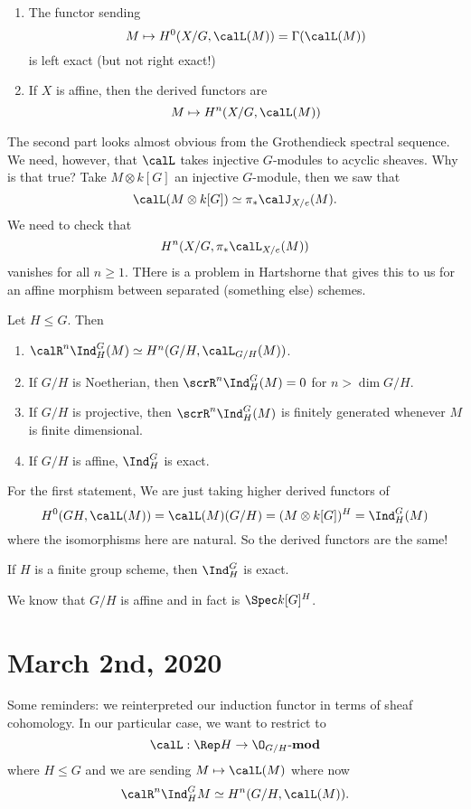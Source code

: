 \documentclass[12pt]{article}
\begin{document}
\begin{prop}
	\begin{enumerate}
		\item The functor sending 
		\[M\mapsto H^0(X/G,\calL(M))=\Gamma(\calL(M))\]
		is left exact (but not right exact!)
		\item If $X$ is affine, then the derived functors are 
		\[M\mapsto H^n(X/G,\calL(M))\]
	\end{enumerate}
\end{prop}
\begin{prf}
	The second part looks almost obvious from the Grothendieck spectral sequence. We need, however, 
	that $\calL$ takes injective $G$-modules to acyclic sheaves. Why is that true? Take $M\otimes k[G]$ an 
	injective $G$-module, then we saw that 
	\[\calL(M\otimes k[G])\simeq \pi_\ast\calJ_{X/e}(M).\]
	We need to check that 
	\[H^n(X/G,\pi_\ast\calL_{X/e}(M))\]
	vanishes for all $n\ge 1$. THere is a problem in Hartshorne that gives this to us for an affine morphism between separated (something else) schemes.
\end{prf}
\begin{prop}
	Let $H\le G$. Then 
	\begin{enumerate}
		\item $\calR^n\Ind_H^G(M)\simeq H^n(G/H,\calL_{G/H}(M))$.
		\item If $G/H$ is Noetherian, then $\scrR^n\Ind_H^G(M)=0$ for $n>\dim G/H$.
		\item If $G/H$ is projective, then $\scrR^n\Ind_H^G(M)$ is finitely generated whenever $M$ is finite dimensional.
		\item If $G/H$ is affine, $\Ind_H^G$ is exact.
	\end{enumerate}
\end{prop}
\begin{prf}
	For the first statement, We are just taking higher derived functors of 
	\[H^0(GH,\calL(M))=\calL(M)(G/H)=(M\otimes k[G])^H=\Ind_H^G(M)\]
	where the isomorphisms here are natural. So the derived functors are the same!
\end{prf}
\begin{cor}
	If $H$ is a finite group scheme, then $\Ind_H^G$ is exact.
\end{cor}
\begin{prf}
	We know that $G/H$ is affine and in fact is $\Spec k[G]^H$.
\end{prf}
\section{March 2nd, 2020}
Some reminders: we reinterpreted our induction functor in terms of sheaf cohomology. In our particular case, 
we want to restrict to 
\[\calL:\Rep H\to \O_{G/H}\text{-}\mathbf{mod}\]
where $H\le G$ and we are sending $M\mapsto \calL(M)$ where now 
\[\calR^n\Ind_H^G M\simeq H^n(G/H,\calL(M)).\]
\end{document}
